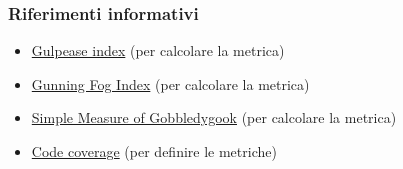 \subsubsection{Riferimenti informativi}
 \begin{itemize}
 	\item  \href{https://it.wikipedia.org/wiki/Indice_Gulpease}{Gulpease index} (per calcolare la metrica)
	\item  \href{https://en.wikipedia.org/wiki/Gunning_fog_index}{Gunning Fog Index} (per calcolare la metrica)
	\item  \href{https://en.wikipedia.org/wiki/SMOG}{Simple Measure of Gobbledygook} (per calcolare la metrica)
	\item  \href{https://en.wikipedia.org/wiki/Code_coverage}{Code coverage} (per definire le metriche)
 \end{itemize}

